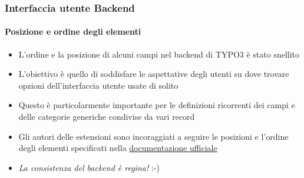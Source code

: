 \begin{frame}[fragile]
	\frametitle{Interfaccia utente Backend}
	\framesubtitle{Posizione e ordine degli elementi}

	\begin{itemize}
		\item L'ordine e la posizione di alcuni campi nel backend di TYPO3 è stato snellito
		\item L'obiettivo è quello di soddisfare le aspettative degli utenti su dove trovare opzioni dell'interfaccia utente usate di solito
		\item Questo è particolarmente importante per le definizioni ricorrenti dei campi e delle categorie generiche condivise da vari record
		\item Gli autori delle estensioni sono incoraggiati a seguire le posizioni e l'ordine degli elementi specificati
			nella \href{https://docs.typo3.org}{documentazione ufficiale}


	\end{itemize}

	\begin{itemize}
		\item \textit{La consistenza del backend è regina!} :-)
	\end{itemize}

\end{frame}

